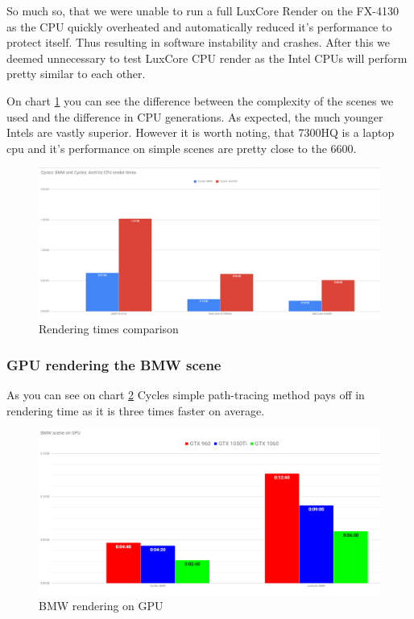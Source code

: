 \documentclass[conference]{IEEEtran}
\begin{document}
    So much so, that we were unable to run a full LuxCore Render on the FX-4130 as the CPU quickly overheated and automatically reduced it's performance to protect itself. Thus resulting in software instability and crashes. After this we deemed unnecessary to test LuxCore CPU render as the Intel CPUs will perform pretty similar to each other.
    
    On chart \ref{fig:rendering_time_cpu} you can see the difference between the complexity of the scenes we used and the difference in CPU generations. As expected, the much younger Intels are vastly superior. However it is worth noting, that 7300HQ is a laptop cpu and it's performance on simple scenes are pretty close to the 6600.
    \begin{figure}[htbp]
            \centering
            \includegraphics[scale=0.2]{Images/cycles_cpu_renderingtimes_graph.png}
            \caption{Rendering times comparison}
            \label{fig:rendering_time_cpu}
        \end{figure}

\subsubsection{GPU rendering the BMW scene}
    As you can see on chart \ref{fig:bmw_gpu_time} Cycles simple path-tracing method pays off in rendering time as it is three times faster on average. 
    \begin{figure}[htbp]
            \centering
            \includegraphics[scale=0.2]{Images/bmw_gpu_time.png}
            \caption{BMW rendering on GPU}
            \label{fig:bmw_gpu_time}
        \end{figure}
    
\end{document}
